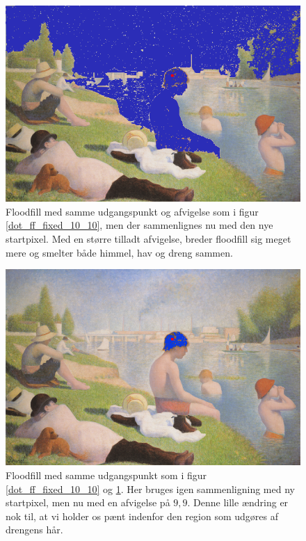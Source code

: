 {\begin{figure}[!h]
    \begin{center}
        \includegraphics[scale=0.49]{afsnit/vores_implementation/billeder/flood_fill/dot_ff_var_10_10}
    \end{center}
    \caption[]{Floodfill med samme udgangspunkt og afvigelse som i figur
    \ref{dot_ff_fixed_10_10}, men der sammenlignes nu med den nye
    startpixel. Med en større tilladt afvigelse, breder floodfill sig
    meget mere og smelter både himmel, hav og dreng sammen.}
    \label{dot_ff_var_10_10}
\end{figure}

\begin{figure}[!h]
    \begin{center}
        \includegraphics[scale=0.49]{afsnit/vores_implementation/billeder/flood_fill/dot_ff_var_9_9}
    \end{center}
    \caption[]{Floodfill med samme udgangspunkt som i figur
    \ref{dot_ff_fixed_10_10} og \ref{dot_ff_var_10_10}. Her bruges igen
    sammenligning med ny startpixel, men nu med en afvigelse på $9,9$.
    Denne lille ændring er nok til, at vi holder os pænt indenfor den
    region som udgøres af drengens hår.}
    \label{dot_ff_var_9_9}
\end{figure}

}
